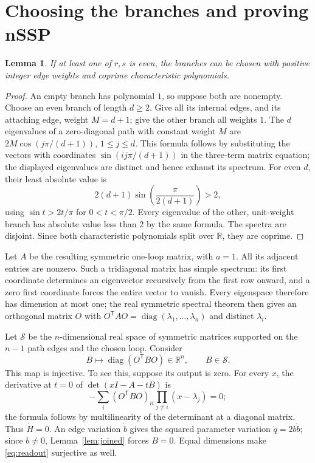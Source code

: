 \documentclass[11pt]{article}
\newtheorem{lemma}[theorem]{Lemma}
\newcommand{\R}{\mathbb R}
\newcommand{\diag}{\operatorname{diag}}
\begin{document}
\section{Choosing the branches and proving nSSP}
\begin{lemma}\label{lem:choose}
If at least one of $r,s$ is even, the branches can be chosen with
positive integer edge weights and coprime characteristic polynomials.
\end{lemma}
\begin{proof}
An empty branch has polynomial $1$, so suppose both are nonempty.
Choose an even branch of length $d\geq2$. Give all its internal edges,
and its attaching edge, weight $M=d+1$; give the other branch all weights
$1$. The $d$ eigenvalues of a zero-diagonal path with constant weight
$M$ are
$2M\cos(j\pi/(d+1))$, $1\leq j\leq d$.
This formula follows by substituting the vectors with coordinates
$\sin(ij\pi/(d+1))$ in the three-term matrix equation; the displayed
eigenvalues are distinct and hence exhaust its spectrum.
For even $d$, their least absolute value is
\[
 2(d+1)\sin\!\left(\frac{\pi}{2(d+1)}\right)>2,
\]
using $\sin t>2t/\pi$ for $0<t<\pi/2$.
Every eigenvalue of the other, unit-weight branch has absolute value
less than $2$ by the same formula. The spectra are disjoint. Since
both characteristic polynomials split over $\R$, they are coprime.
\end{proof}

Let $A$ be the resulting symmetric one-loop matrix, with $a=1$.
All its adjacent entries are nonzero. Such a tridiagonal matrix has
simple spectrum: its first coordinate determines an eigenvector
recursively from the first row onward, and a zero first coordinate
forces the entire vector to vanish. Every eigenspace therefore has
dimension at most one; the real symmetric spectral theorem then gives
an orthogonal matrix $O$ with
$O^{\mathsf T}AO=\diag(\lambda_1,\ldots,\lambda_n)$ and distinct
$\lambda_i$.

Let $\mathcal S$ be the $n$-dimensional real space of symmetric
matrices supported on the $n-1$ path edges and the chosen loop.
Consider
\begin{equation}\label{eq:readout}
 B\longmapsto\diag(O^{\mathsf T}BO)\in\R^n,
 \qquad B\in\mathcal S.
\end{equation}
This map is injective. To see this, suppose its output is zero.
For every $x$, the derivative at $t=0$ of
$\det(xI-A-tB)$ is
\[
 -\sum_i (O^{\mathsf T}BO)_{ii}\prod_{j\ne i}(x-\lambda_j)=0;
\]
the formula follows by multilinearity of the determinant at a diagonal
matrix. Thus $\dot H=0$. An edge variation $\dot b$ gives the squared
parameter variation $\dot q=2b\dot b$; since $b\ne0$,
Lemma~\ref{lem:joined} forces $B=0$. Equal dimensions make
\eqref{eq:readout} surjective as well.
\end{document}
